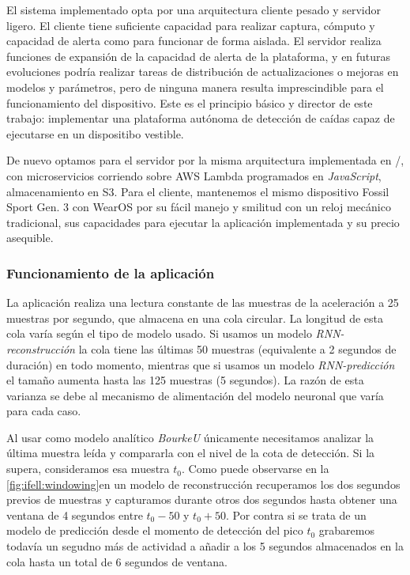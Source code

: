 El sistema implementado opta por una arquitectura cliente pesado y servidor ligero. El cliente tiene suficiente capacidad para realizar captura, cómputo y capacidad de alerta como para funcionar de forma aislada. El servidor realiza funciones de expansión de la capacidad de alerta de la plataforma, y en futuras evoluciones podría realizar tareas de distribución de actualizaciones o mejoras en modelos y parámetros, pero de ninguna manera resulta imprescindible para el funcionamiento del dispositivo. Este es el principio básico y director de este trabajo: implementar una plataforma autónoma de detección de caídas capaz de ejecutarse en un dispositibo vestible.

De nuevo optamos para el servidor por la misma arquitectura implementada en \accelcapture/, con microservicios corriendo sobre AWS Lambda programados en \textit{JavaScript}, almacenamiento en S3. Para el cliente, mantenemos el mismo dispositivo Fossil Sport Gen. 3 con WearOS por su fácil manejo y smilitud con un reloj mecánico tradicional, sus capacidades para ejecutar la aplicación implementada y su precio asequible.

\subsubsection{Funcionamiento de la aplicación}

La aplicación realiza una lectura constante de las muestras de la aceleración a 25 muestras por segundo, que almacena en una cola circular. La longitud de esta cola varía según el tipo de modelo usado. Si usamos un modelo \textit{RNN-reconstrucción} la cola tiene las últimas 50 muestras (equivalente a 2 segundos de duración) en todo momento, mientras que si usamos un modelo \textit{RNN-predicción} el tamaño aumenta hasta las 125 muestras (5 segundos). La razón de esta varianza se debe al mecanismo de alimentación del modelo neuronal que varía para cada caso.

Al usar como modelo analítico \textit{BourkeU} únicamente necesitamos analizar la última muestra leída y compararla con el nivel de la cota de detección. Si la supera, consideramos esa muestra $t_0$. Como puede observarse en la \autoref{fig:ifell:windowing}en un modelo de reconstrucción recuperamos los dos segundos previos de muestras y capturamos durante otros dos segundos hasta obtener una ventana de 4 segundos entre $t_0-50$ y $t_0+50$. Por contra si se trata de un modelo de predicción desde el momento de detección del pico $t_0$ grabaremos todavía un segudno más de actividad a añadir a los 5 segundos almacenados en la cola hasta un total de 6 segundos de ventana. 

